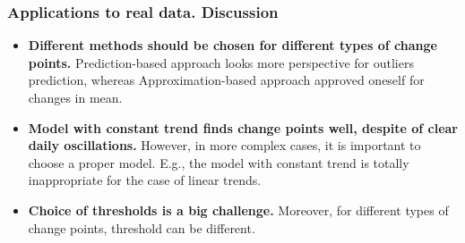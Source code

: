 \documentclass[intlimits, 9pt, unicode]{beamer}
\begin{document}
\begin{frame}
    \frametitle{Applications to real data. Discussion}


\begin{itemize}
	\item \textbf{Different methods should be chosen for different types of change points.} Prediction-based approach looks more perspective for outliers prediction, whereas Approximation-based approach approved oneself for changes in mean.
\bigskip
	\item \textbf{Model with constant trend finds change points well, despite of clear daily oscillations.} However, in more complex cases, it is important to choose a proper model. E.g., the model with constant trend is totally inappropriate for the case of linear trends.
\bigskip
	\item \textbf{Choice of thresholds is a big challenge.} Moreover, for different types of change points,
threshold can be different.
\end{itemize}

\end{frame}







	
\end{document}
